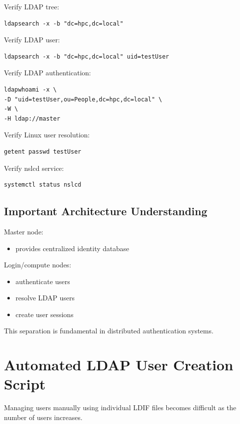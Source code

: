 \documentclass[11pt]{article}
\begin{document}
Verify LDAP tree:

\begin{verbatim}
ldapsearch -x -b "dc=hpc,dc=local"
\end{verbatim}

Verify LDAP user:

\begin{verbatim}
ldapsearch -x -b "dc=hpc,dc=local" uid=testUser
\end{verbatim}

Verify LDAP authentication:

\begin{verbatim}
ldapwhoami -x \
-D "uid=testUser,ou=People,dc=hpc,dc=local" \
-W \
-H ldap://master
\end{verbatim}

Verify Linux user resolution:

\begin{verbatim}
getent passwd testUser
\end{verbatim}

Verify nslcd service:

\begin{verbatim}
systemctl status nslcd
\end{verbatim}
\subsection{Important Architecture Understanding}
\label{sec:orgcb3989b}

Master node:
\begin{itemize}
\item provides centralized identity database
\end{itemize}

Login/compute nodes:
\begin{itemize}
\item authenticate users
\item resolve LDAP users
\item create user sessions
\end{itemize}

This separation is fundamental in distributed authentication systems.
\section{Automated LDAP User Creation Script}
\label{sec:orgdc59757}

Managing users manually using individual LDIF files becomes difficult
as the number of users increases.
\end{document}
